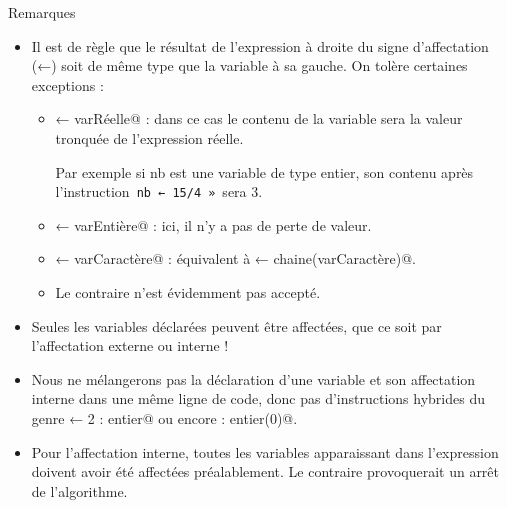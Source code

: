 \documentclass[11pt,a4paper]{article}
\begin{document}
				Remarques
				
					\begin{itemize}
				
			\item 
              Il est de r\`egle que le r\'esultat de l'expression \`a droite du signe d'affectation (←) soit de
              m\^eme type que la variable \`a sa gauche. On tol\`ere certaines exceptions :
              
					\begin{itemize}
				
			\item {} ← varRéelle@ : dans ce cas le contenu de la variable sera la valeur tronqu\'ee de l'expression r\'eelle. \par
				
                  Par exemple si \guillemotleft  nb \guillemotright  est une variable de type entier,
                  son contenu apr\`es l'instruction \,\verb|nb ← 15/4 »|\, sera 3.
                
			\item {} ← varEntière@ : ici, il n'y a pas de perte de valeur.
			\item \verb@varChaine ← varCaractère@ : \'equivalent \`a \verb@varChaine ← chaine(varCaractère)@.
			\item Le contraire n'est \'evidemment pas accept\'e.
					\end{itemize}
				
			\item 
            Seules les variables d\'eclar\'ees peuvent \^etre affect\'ees, que ce soit par l'affectation externe
            ou interne !
            
			\item 
            Nous ne m\'elangerons pas la d\'eclaration d'une variable et son affectation interne dans
            une m\^eme ligne de code, donc pas d'instructions hybrides du genre \verb@x ← 2 : entier@ ou
            encore \verb@x : entier(0)@.
            
			\item 
            Pour l'affectation interne, toutes les variables apparaissant dans l'expression doivent
            avoir \'et\'e affect\'ees pr\'ealablement. Le contraire provoquerait un arr\^et de l'algorithme.
            
					\end{itemize}
				
            \par
\end{document}
